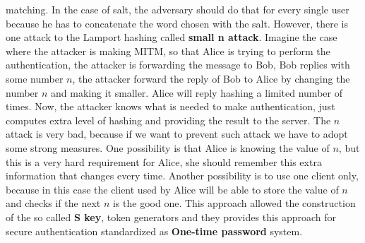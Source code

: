 \documentclass[11pt]{article}
\begin{document}
matching. In the case of salt, the adversary should do that for every single user because he has to concatenate the word chosen with the salt. However, there is one attack to the Lamport hashing called \textbf{small n attack}. Imagine the case where the attacker is making MITM, so that Alice is trying to perform the authentication, the attacker is forwarding the message to Bob, Bob replies with some number $n$, the attacker forward the reply of Bob to Alice by changing the number $n$ and making it smaller. Alice will reply hashing a limited number of times. Now, the attacker knows what is needed to make authentication, just computes extra level of hashing and providing the result to the server. The $n$ attack is very bad, because if we want to prevent such attack we have to adopt some strong measures. One possibility is that Alice is knowing the value of $n$, but this is a very hard requirement for Alice, she should remember this extra information that changes every time. Another possibility is to use one client only, because in this case the client used by Alice will be able to store the value of $n$ and checks if the next $n$ is the good one. This approach allowed the construction of the so called \textbf{S key}, token generators and they provides this approach for secure authentication standardized as \textbf{One-time password} system.
\end{document}
